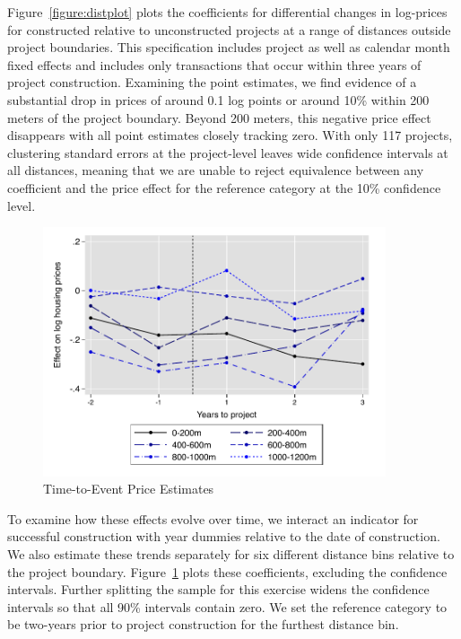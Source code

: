 \documentclass[12pt]{article}
\begin{document}
Figure~\ref{figure:distplot} plots the coefficients for differential changes in log-prices for constructed relative to unconstructed projects at a range of distances outside project boundaries.  This specification includes project as well as calendar month fixed effects and includes only transactions that occur within three years of project construction.  Examining the point estimates, we find evidence of a substantial drop in prices of around 0.1 log points or around 10\% within 200 meters of the project boundary.  Beyond 200 meters, this negative price effect disappears with all point estimates closely tracking zero.  With only 117 projects, clustering standard errors at the project-level leaves wide confidence intervals at all distances, meaning that we are unable to reject equivalence between any coefficient and the price effect for the reference category at the 10\% confidence level.

\begin{figure}
\caption{Time-to-Event Price Estimates}\label{figure:timeplot}
\centering
\includegraphics[width=0.9\textwidth,trim={0cm .1cm 0cm 0.1cm},clip=true]{figures/DDDplot_pertime_alt}
\vspace{-2mm}
\end{figure}

To examine how these effects evolve over time, we interact an indicator for successful construction with year dummies relative to the date of construction.  We also estimate these trends separately for six different distance bins relative to the project boundary.  Figure~\ref{figure:timeplot} plots these coefficients, excluding the confidence intervals.  Further splitting the sample for this exercise widens the confidence intervals so that all 90\% intervals contain zero.  We set the reference category to be two-years prior to project construction for the furthest distance bin.  
\end{document}
